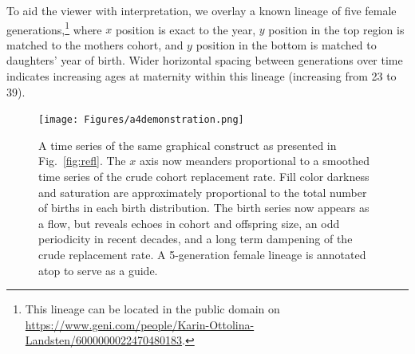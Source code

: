 \documentclass{article}
\begin{document}
To aid the viewer with interpretation, we overlay a known lineage of five female generations,\footnote{This lineage can be located in the public domain on \url{https://www.geni.com/people/Karin-Ottolina-Landsten/6000000022470480183}.} where $x$ position is exact to the year, $y$ position in the top region is matched to the mothers cohort, and $y$ position in the bottom is matched to daughters' year of birth. Wider horizontal spacing between generations over time indicates increasing ages at maternity within this lineage (increasing from 23 to 39).



\begin{figure}
\texttt{[image: Figures/a4demonstration.png]}
%
\caption{A time series of the same graphical construct as presented in Fig.~\ref{fig:refl}. The $x$ axis now meanders proportional to a smoothed time series of the crude cohort replacement rate. Fill color darkness and saturation are approximately proportional to the total number of births in each birth distribution. The birth series now appears as a flow, but reveals echoes in cohort and offspring size, an odd periodicity in recent decades, and a long term dampening of the crude replacement rate. A 5-generation female lineage is annotated atop to serve as a guide.}
\label{fig:foldout}
\end{figure}
\end{document}
